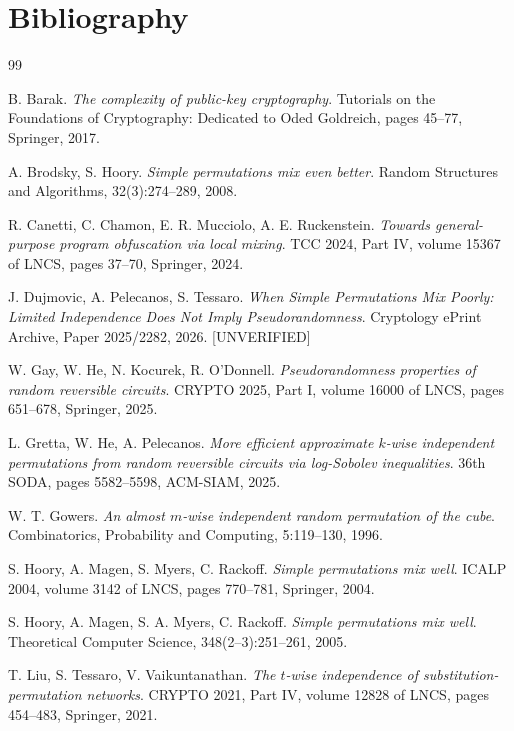 \documentclass{conjura-conjecture}
\begin{document}
\section{Bibliography}

\begin{conjurabibliography}{99}

B. Barak.
\emph{The complexity of public-key cryptography}.
Tutorials on the Foundations of Cryptography: Dedicated to Oded
Goldreich, pages 45--77, Springer, 2017.

A. Brodsky, S. Hoory.
\emph{Simple permutations mix even better}.
Random Structures and Algorithms, 32(3):274--289, 2008.

R. Canetti, C. Chamon, E. R. Mucciolo, A. E. Ruckenstein.
\emph{Towards general-purpose program obfuscation via local mixing}.
TCC 2024, Part IV, volume 15367 of LNCS, pages 37--70, Springer, 2024.

J. Dujmovic, A. Pelecanos, S. Tessaro.
\emph{When Simple Permutations Mix Poorly: Limited Independence Does Not
Imply Pseudorandomness}.
Cryptology ePrint Archive, Paper 2025/2282, 2026. [UNVERIFIED]

W. Gay, W. He, N. Kocurek, R. O'Donnell.
\emph{Pseudorandomness properties of random reversible circuits}.
CRYPTO 2025, Part I, volume 16000 of LNCS, pages 651--678, Springer,
2025.

L. Gretta, W. He, A. Pelecanos.
\emph{More efficient approximate $k$-wise independent permutations from
random reversible circuits via log-Sobolev inequalities}.
36th SODA, pages 5582--5598, ACM-SIAM, 2025.

W. T. Gowers.
\emph{An almost $m$-wise independent random permutation of the cube}.
Combinatorics, Probability and Computing, 5:119--130, 1996.

S. Hoory, A. Magen, S. Myers, C. Rackoff.
\emph{Simple permutations mix well}.
ICALP 2004, volume 3142 of LNCS, pages 770--781, Springer, 2004.

S. Hoory, A. Magen, S. A. Myers, C. Rackoff.
\emph{Simple permutations mix well}.
Theoretical Computer Science, 348(2--3):251--261, 2005.

T. Liu, S. Tessaro, V. Vaikuntanathan.
\emph{The $t$-wise independence of substitution-permutation networks}.
CRYPTO 2021, Part IV, volume 12828 of LNCS, pages 454--483, Springer,
2021.

\end{conjurabibliography}
\end{document}
